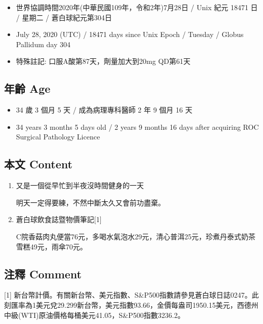 \documentclass[
]{article}
\providecommand{\tightlist}{%
  \setlength{\itemsep}{0pt}\setlength{\parskip}{0pt}}
\begin{document}
\begin{itemize}
\tightlist
\item
  世界協調時間2020年(中華民國109年，令和2年)7月28日 / Unix 紀元 18471 日
  / 星期二 / 蒼白球紀元第304日
\item
  July 28, 2020 (UTC) / 18471 days since Unix Epoch / Tuesday / Globus
  Pallidum day 304
\item
  特殊註記: 口服A酸第87天，劑量加大到20mg QD第61天
\end{itemize}

\hypertarget{ux5e74ux9f61-age-24}{%
\subsection{年齡 Age}\label{ux5e74ux9f61-age-24}}

\begin{itemize}
\tightlist
\item
  34 歲 3 個月 5 天 / 成為病理專科醫師 2 年 9 個月 16 天
\item
  34 years 3 months 5 days old / 2 years 9 months 16 days after
  acquiring ROC Surgical Pathology Licence
\end{itemize}

\hypertarget{ux672cux6587-content-24}{%
\subsection{本文 Content}\label{ux672cux6587-content-24}}

\begin{enumerate}
\def\labelenumi{\arabic{enumi}.}
\item
  又是一個從早忙到半夜沒時間健身的一天

  明天一定得要練，不然中斷太久又會前功盡棄。
\item
  蒼白球飲食誌暨物價筆記{[}1{]}

  C院香菇肉丸便當76元，多喝水氣泡水29元，清心普洱25元，珍煮丹泰式奶茶雪糕49元，雨傘70元。
\end{enumerate}

\hypertarget{ux6ce8ux91cb-comment-24}{%
\subsection{注釋 Comment}\label{ux6ce8ux91cb-comment-24}}

{[}1{]}
新台幣計價。有關新台幣、美元指數、S\&P500指數請參見蒼白球日誌0247。此刻匯率為1美元兌29.299新台幣，美元指數93.66，金價每盎司1950.15美元，西德州中級(WTI)原油價格每桶美元41.05，S\&P500指數3236.2。
\end{document}
